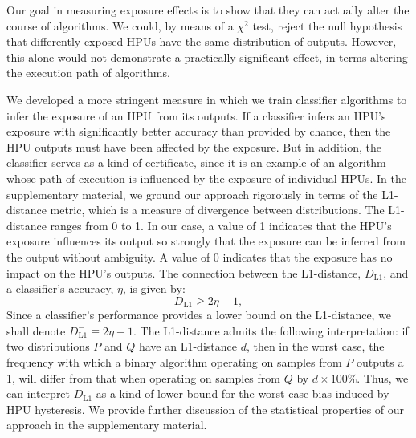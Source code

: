 \documentclass[12pt]{article}
\begin{document}
Our goal in measuring exposure effects is to show that they can actually 
alter the course of algorithms.
We could, by means of a $\chi^2$ test, reject the null hypothesis that
differently exposed HPUs have the same distribution of outputs.
However, this alone would not demonstrate a practically significant effect, in 
terms altering the execution path of algorithms.

We developed a more stringent measure in which we train classifier algorithms 
to infer the exposure of an HPU from its outputs.
If a classifier infers an HPU's exposure with significantly 
better accuracy than provided by chance, then the HPU outputs must have 
been affected by the exposure.  
But in addition, the classifier serves as a kind of certificate, since it is 
an example of an algorithm whose path of execution is influenced by the 
exposure of 
individual HPUs.  In the supplementary material, we ground our approach 
rigorously in terms of the L1-distance metric, which is a measure of 
divergence between distributions.  The L1-distance ranges from 
0 to 1.  In our case, a value of 1 indicates that the HPU's exposure
influences its output so strongly that the exposure can be inferred from the
output without ambiguity.  A value of 0 indicates that the exposure has no
impact on the HPU's outputs.  The connection between the
L1-distance, $D_\mathrm{L1}$, and a classifier's accuracy, $\eta$, is given by:
\begin{equation}
	D_\mathrm{L1} \geq 2 \eta - 1, 
	\label{l1}
\end{equation}
Since a classifier's performance provides a lower bound on the L1-distance, 
we shall denote $D_\mathrm{L1}^-\equiv 2\eta-1$.
The L1-distance admits the following interpretation: if two distributions
$P$ and $Q$ have an L1-distance $d$, then in the worst case, the 
frequency with which a binary algorithm operating on samples
from $P$ outputs a 1, will differ from that when operating on samples from 
$Q$ by $d \times 100\%$.  
Thus, we can interpret $D_\mathrm{L1}^-$ as a kind of
lower bound for the worst-case bias induced by HPU hysteresis.
We provide further discussion of the statistical properties of our approach 
in the supplementary material.
\end{document}
